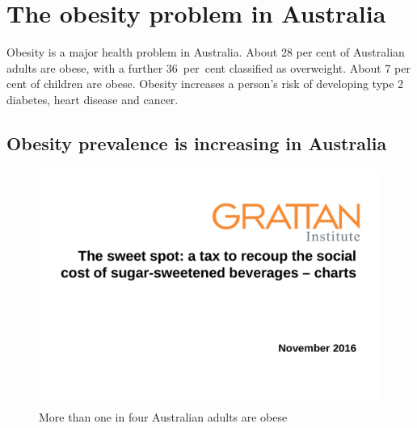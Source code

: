 \documentclass[embargoed]{grattan}
\begin{document}
\contentspage

\listoffigures

\chapter{The obesity problem in Australia}\label{the-obesity-problem-in-australia}

Obesity is a major health problem in Australia.
About 28 per cent of Australian adults are obese, with a further 36~per~cent classified as overweight.
About 7 per cent of children are obese.
Obesity increases a person's risk of developing type 2 diabetes, heart disease and cancer.

\section{Obesity prevalence is increasing in Australia }\label{obesity-prevalence-is-increasing-in-australia}

\begin{figure}
\caption{More than one in four Australian adults are obese}\label{fig:more-than-one-in-four-Australian-adults-are-obese}

\includegraphics[page=2]{atlas/ObesityCharts}


\end{figure}
\end{document}
